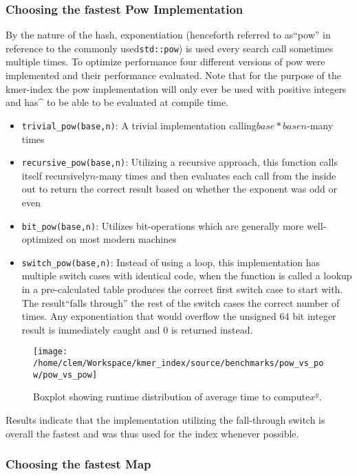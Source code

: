 \subsubsection{Choosing the fastest Pow Implementation}

By the nature of the hash, exponentiation (henceforth referred to
as``pow'' in reference to the commonly used\lstinline{std::pow})
is used every search call sometimes multiple times. To optimize performance
four different versions of pow were implemented and their performance
evaluated. Note that for the purpose of the kmer-index the pow implementation
will only ever be used with positive integers and has\textasciicircum{}
to be able to be evaluated at compile time.
\begin{itemize}
\item \lstinline{trivial_pow(base,n)}: A trivial implementation calling$base*base$$n$-many
times
\item \lstinline{recursive_pow(base,n)}: Utilizing a recursive approach,
this function calls itself recursively$n$-many times and then evaluates
each call from the inside out to return the correct result based on
whether the exponent was odd or even
\item \lstinline{bit_pow(base,n)}: Utilizes bit-operations which are generally
more well-optimized on most modern machines
\item \lstinline{switch_pow(base,n)}: Instead of using a loop, this implementation
has multiple switch cases with identical code, when the function is
called a lookup in a pre-calculated table produces the correct first
switch case to start with. The result``falls through'' the rest
of the switch cases the correct number of times. Any exponentiation
that would overflow the unsigned 64 bit integer result is immediately
caught and 0 is returned instead.
\end{itemize}
\begin{figure}[H]
\textasciiacute \texttt{[image: /home/clem/Workspace/kmer\_index/source/benchmarks/pow\_vs\_pow/pow\_vs\_pow]}

\caption{Boxplot showing runtime distribution of average time to compute$x^{y}$.}
\end{figure}

Results indicate that the implementation utilizing the fall-through
switch is overall the fastest and was thus used for the index whenever
possible.

\subsubsection{Choosing the fastest Map}

